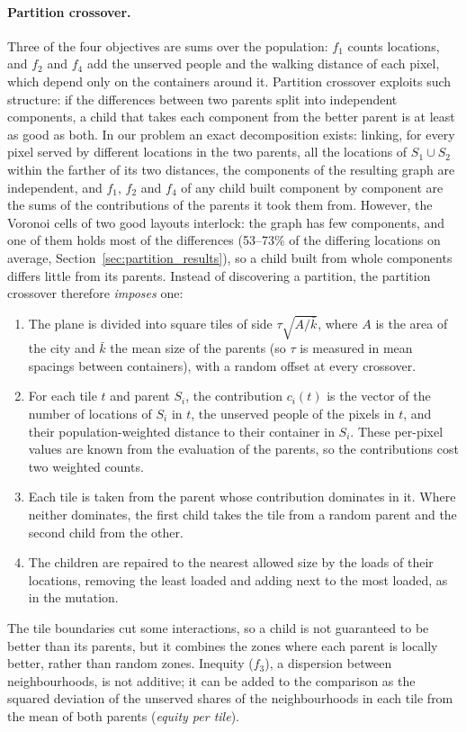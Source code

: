 \paragraph{Partition crossover.}
Three of the four objectives are sums over the population: $f_1$ counts locations, and $f_2$ and $f_4$ add the unserved people and the walking distance of each pixel, which depend only on the containers around it. Partition crossover \cite{whitley2009tunneling,tinos2015partition} exploits such structure: if the differences between two parents split into independent components, a child that takes each component from the better parent is at least as good as both. In our problem an exact decomposition exists: linking, for every pixel served by different locations in the two parents, all the locations of $S_1 \cup S_2$ within the farther of its two distances, the components of the resulting graph are independent, and $f_1$, $f_2$ and $f_4$ of any child built component by component are the sums of the contributions of the parents it took them from. However, the Voronoi cells of two good layouts interlock: the graph has few components, and one of them holds most of the differences (53--73\% of the differing locations on average, Section~\ref{sec:partition_results}), so a child built from whole components differs little from its parents. Instead of discovering a partition, the partition crossover therefore \emph{imposes} one:
\begin{enumerate}
\item The plane is divided into square tiles of side $\tau \sqrt{A / \bar{k}}$, where $A$ is the area of the city and $\bar{k}$ the mean size of the parents (so $\tau$ is measured in mean spacings between containers), with a random offset at every crossover.
\item For each tile $t$ and parent $S_i$, the contribution $c_i(t)$ is the vector of the number of locations of $S_i$ in $t$, the unserved people of the pixels in $t$, and their population-weighted distance to their container in $S_i$. These per-pixel values are known from the evaluation of the parents, so the contributions cost two weighted counts.
\item Each tile is taken from the parent whose contribution dominates in it. Where neither dominates, the first child takes the tile from a random parent and the second child from the other.
\item The children are repaired to the nearest allowed size by the loads of their locations, removing the least loaded and adding next to the most loaded, as in the mutation.
\end{enumerate}
The tile boundaries cut some interactions, so a child is not guaranteed to be better than its parents, but it combines the zones where each parent is locally better, rather than random zones. Inequity ($f_3$), a dispersion between neighbourhoods, is not additive; it can be added to the comparison as the squared deviation of the unserved shares of the neighbourhoods in each tile from the mean of both parents (\emph{equity per tile}).

